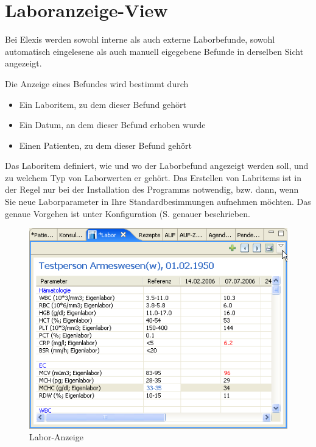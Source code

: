 
\section{Laboranzeige-View}
Bei Elexis werden sowohl interne als auch externe Laborbefunde, sowohl
automatisch eingelesene als auch manuell eigegebene Befunde in derselben Sicht
angezeigt.

Die  Anzeige eines Befundes wird bestimmt durch
\begin{itemize}
  \item Ein Laboritem, zu dem dieser Befund gehört
  \item Ein Datum, an dem dieser Befund erhoben wurde
  \item Einen Patienten, zu dem dieser Befund gehört
\end{itemize}

Das Laboritem definiert, wie und wo der Laborbefund angezeigt werden soll, und
zu welchem Typ von Laborwerten er gehört. Das Erstellen von Labritems ist in der Regel nur bei der Installation des
Programms notwendig, bzw. dann, wenn Sie neue Laborparameter in Ihre
Standardbesimmungen aufnehmen möchten. Das genaue Vorgehen ist unter Konfiguration (S. \pageref{config:labor} genauer beschrieben.

\begin{figure}[htp]
\begin{center}
  \includegraphics{images/labview}
  \caption{Labor-Anzeige}
  \label{fig:labview}
\end{center}
\end{figure}

